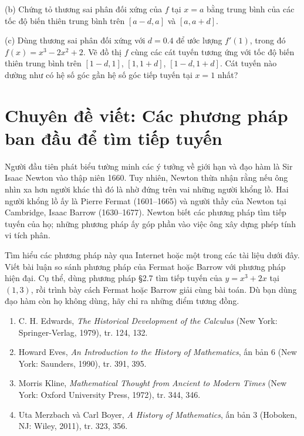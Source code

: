 \documentclass[12pt,a4paper]{article}
\begin{document}
(b) Chứng tỏ thương sai phân đối xứng của $f$ tại $x=a$ bằng trung bình của các tốc độ biến thiên trung bình trên $[a-d,a]$ và $[a,a+d]$.

(c) Dùng thương sai phân đối xứng với $d=0.4$ để ước lượng $f'(1)$, trong đó $f(x)=x^3-2x^2+2$. Vẽ đồ thị $f$ cùng các cát tuyến tương ứng với tốc độ biến thiên trung bình trên $[1-d,1]$, $[1,1+d]$, $[1-d,1+d]$. Cát tuyến nào dường như có hệ số góc gần hệ số góc tiếp tuyến tại $x=1$ nhất?
\section*{Chuyên đề viết: Các phương pháp ban đầu để tìm tiếp tuyến}
Người đầu tiên phát biểu tường minh các ý tưởng về giới hạn và đạo hàm là Sir Isaac Newton vào thập niên 1660. Tuy nhiên, Newton thừa nhận rằng nếu ông nhìn xa hơn người khác thì đó là nhờ đứng trên vai những người khổng lồ. Hai người khổng lồ ấy là Pierre Fermat (1601–1665) và người thầy của Newton tại Cambridge, Isaac Barrow (1630–1677). Newton biết các phương pháp tìm tiếp tuyến của họ; những phương pháp ấy góp phần vào việc ông xây dựng phép tính vi tích phân.

Tìm hiểu các phương pháp này qua Internet hoặc một trong các tài liệu dưới đây. Viết bài luận so sánh phương pháp của Fermat hoặc Barrow với phương pháp hiện đại. Cụ thể, dùng phương pháp §2.7 tìm tiếp tuyến của $y=x^3+2x$ tại $(1,3)$, rồi trình bày cách Fermat hoặc Barrow giải cùng bài toán. Dù bạn dùng đạo hàm còn họ không dùng, hãy chỉ ra những điểm tương đồng.
\begin{enumerate}
\item C. H. Edwards, \textit{The Historical Development of the Calculus} (New York: Springer-Verlag, 1979), tr. 124, 132.
\item Howard Eves, \textit{An Introduction to the History of Mathematics}, ấn bản 6 (New York: Saunders, 1990), tr. 391, 395.
\item Morris Kline, \textit{Mathematical Thought from Ancient to Modern Times} (New York: Oxford University Press, 1972), tr. 344, 346.
\item Uta Merzbach và Carl Boyer, \textit{A History of Mathematics}, ấn bản 3 (Hoboken, NJ: Wiley, 2011), tr. 323, 356.
\end{enumerate}
\end{document}
